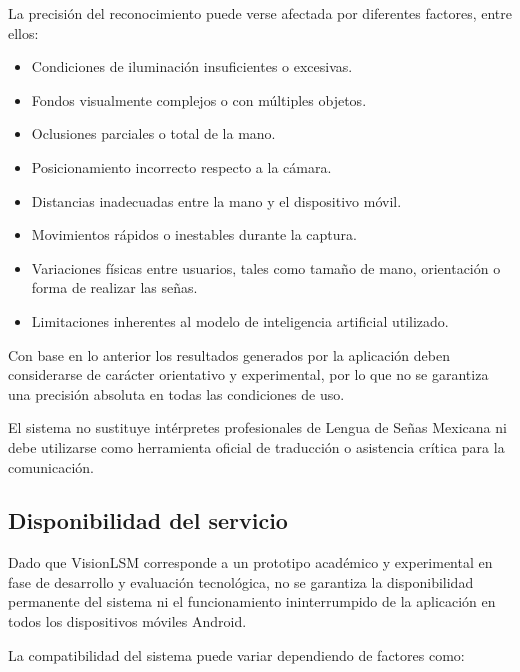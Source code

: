 	La precisión del reconocimiento puede verse afectada por diferentes factores, entre ellos:
	
	\begin{itemize}
		\item Condiciones de iluminación insuficientes o excesivas.
		
		\item Fondos visualmente complejos o con múltiples objetos.
		
		\item Oclusiones parciales o total de la mano.
		
		\item Posicionamiento incorrecto respecto a la cámara.
		
		\item Distancias inadecuadas entre la mano y el dispositivo móvil.
		
		\item Movimientos rápidos o inestables durante la captura.
		
		\item Variaciones físicas entre usuarios, tales como tamaño de mano, orientación o forma de realizar las señas.
		
		\item Limitaciones inherentes al modelo de inteligencia artificial utilizado.
	\end{itemize}
	
	Con base en lo anterior los resultados generados por la aplicación deben considerarse de carácter orientativo y experimental, por lo que no se garantiza una precisión absoluta en todas las condiciones de uso.
	
	El sistema no sustituye intérpretes profesionales de Lengua de Señas Mexicana ni debe utilizarse como herramienta oficial de traducción o asistencia crítica para la comunicación.
	
	\subsection{Disponibilidad del servicio}
	
	Dado que VisionLSM corresponde a un prototipo académico y experimental en fase de desarrollo y evaluación tecnológica, no se garantiza la disponibilidad permanente del sistema ni el funcionamiento ininterrumpido de la aplicación en todos los dispositivos móviles Android.
	
	La compatibilidad del sistema puede variar dependiendo de factores como:
	
